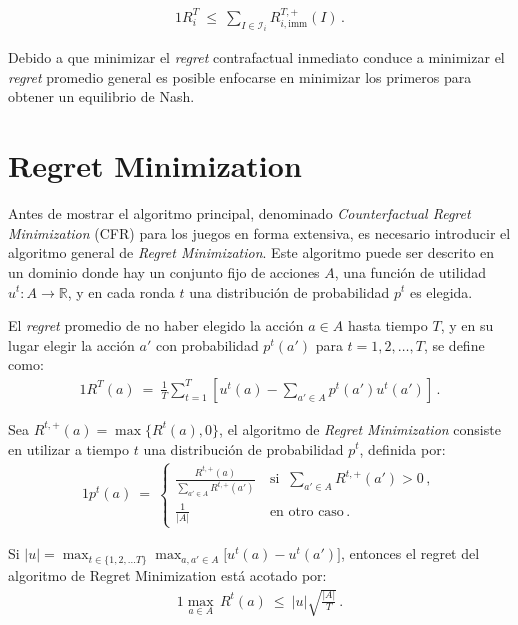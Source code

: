 \begin{theorem}
\begin{alignat}{1}
R_i^T\ \leq\ \sum_{I \in \mathcal{I}_i} R_{i, \text{imm}}^{T, +}(I) \,.
\end{alignat}
\end{theorem}

Debido a que minimizar el \textit{regret} contrafactual inmediato conduce a minimizar el \textit{regret} promedio general es posible enfocarse en minimizar los primeros para obtener un equilibrio de Nash.

\section{Regret Minimization}

Antes de mostrar el algoritmo principal, denominado \textit{Counterfactual Regret Minimization} (CFR) para los juegos en forma extensiva, es necesario introducir el algoritmo general de \textit{Regret Minimization}. Este algoritmo puede ser descrito en un dominio donde hay un conjunto fijo de acciones $A$, una función de utilidad $u^t : A \rightarrow \mathbb{R}$, y en cada ronda $t$ una distribución de probabilidad $p^t$ es elegida.

\begin{definition}
\label{def:regret}
El \textit{regret} promedio de no haber elegido la acción $a \in A$ hasta tiempo $T$, y en su lugar elegir la acción $a'$ con probabilidad $p^t(a')$ para $t=1,2,\ldots,T$, se define como:
\begin{alignat}{1}
R^T(a)\ =\ \frac{1}{T} \sum_{t = 1}^T \left[u^t(a) - \sum_{a' \in A}p^t(a')u^t(a')\right] \,.
\end{alignat}
\end{definition}

Sea $R^{t, +}(a) = \max\{R^t(a), 0\}$, el algoritmo de \textit{Regret Minimization} consiste en utilizar a tiempo $t$ una distribución de probabilidad $p^t$, definida por:
\begin{alignat}{1}
p^t(a)\ =\ 
\begin{cases}
\frac{R^{t, +}(a)}{\sum_{a' \in A} R^{t, +}(a')}\ & \text{si }\ \sum_{a' \in A} R^{t, +}(a') > 0 \,, \\
\frac{1}{|A|}\ & \text{en otro caso} \,.
\end{cases}
\end{alignat}

\begin{theorem}
Si $|u| = \max_{t \in \{1, 2, ... T\}} \max_{a, a' \in A}\bigl[u^t(a) - u^t(a')\bigr]$, entonces el regret del algoritmo de Regret Minimization está acotado por:
\begin{alignat}{1}
\max_{a \in A}\,R^t(a)\ \leq\ |u| \sqrt{\frac{|A|}{T}} \,.
\end{alignat}
\end{theorem}

